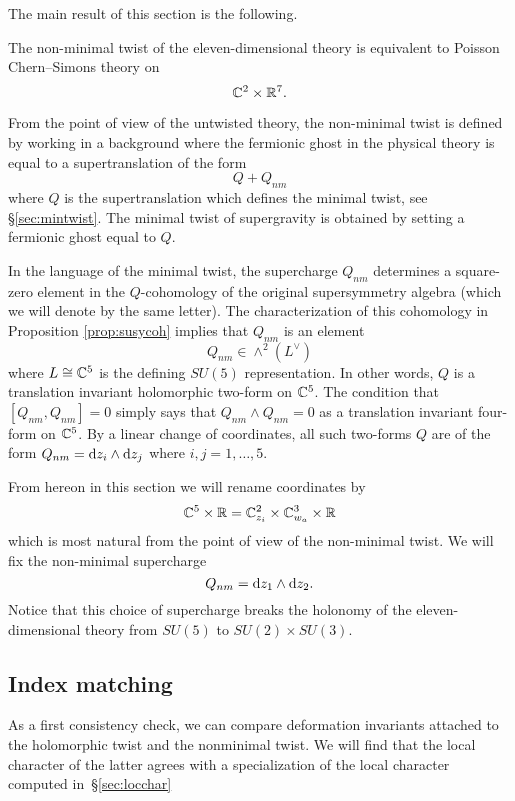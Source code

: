 The main result of this section is the following.

\begin{thm}
\label{thm:nonmin}
The non-minimal twist of the eleven-dimensional theory is equivalent to Poisson Chern--Simons theory on 
\[
\mathbb C^2 \times \mathbb R^7 .
\]
\end{thm}

From the point of view of the untwisted theory, the non-minimal twist is defined by working in a background where the fermionic ghost in the physical theory is equal to a supertranslation of the form
\[
Q + Q_{nm} 
\]
where $Q$ is the supertranslation which defines the minimal twist, see \S \ref{sec:mintwist}.
The minimal twist of supergravity is obtained by setting a fermionic ghost equal to $Q$. 

In the language of the minimal twist, the supercharge $Q_{nm}$ determines a square-zero element in the $Q$-cohomology of the original supersymmetry algebra (which we will denote by the same letter). 
The characterization of this cohomology in Proposition \ref{prop:susycoh} implies that $Q_{nm}$ is an element 
\[
Q_{nm} \in \wedge^2 \left(L^\vee\right)
\]
where $L \cong \mathbb C^5$ is the defining $SU(5)$ representation. 
In other words, $Q$ is a translation invariant holomorphic two-form on $\mathbb C^5$. 
The condition that $[Q_{nm}, Q_{nm}] = 0$ simply says that $Q_{nm}\wedge Q_{nm} = 0$ as a translation invariant four-form on $\mathbb C^5$. 
By a linear change of coordinates, all such two-forms $Q$ are of the form $Q_{nm} = {\rm d} z_i \wedge {\rm d} z_j$ where $i,j=1,\ldots, 5$.

From hereon in this section we will rename coordinates by
\[
\mathbb C^5 \times \mathbb R = \mathbb C^2_{z_i} \times \mathbb C^3_{w_a} \times \mathbb R
\]
which is most natural from the point of view of the non-minimal twist. 
We will fix the non-minimal supercharge 
\[
Q_{nm} = {\rm d} z_1 \wedge {\rm d} z_2 .
\]
Notice that this choice of supercharge breaks the holonomy of the eleven-dimensional theory from $SU(5)$ to $SU(2) \times SU(3)$. 

\subsection{Index matching}
\label{sec:indexcheck}

As a first consistency check, we can compare deformation invariants attached to the holomorphic twist and the nonminimal twist. We will find that the local character of the latter agrees with a specialization of the local character computed in~\S\ref{sec:locchar}

